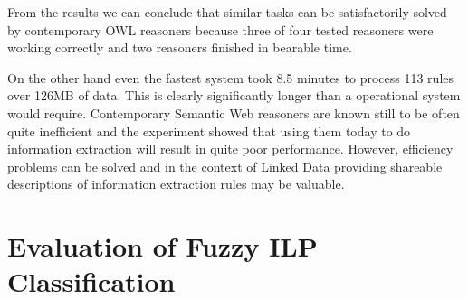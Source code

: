From the results we can conclude that similar tasks can be satisfactorily solved by contemporary OWL reasoners because three of four tested reasoners were working correctly and two reasoners finished in bearable time.

On the other hand even the fastest system took 8.5 minutes to process 113 rules over 126MB of data. This is clearly   significantly longer than a operational system would require. 
Contemporary Semantic Web reasoners are known still to be often quite inefficient and the experiment showed that using them today to do information extraction will result in quite poor performance. However, efficiency problems can be solved
and in the context of Linked Data providing shareable descriptions of information extraction rules may be valuable.















\section{Evaluation of Fuzzy ILP Classification} \label{sec:fuzzy_eval}
\graphicspath{{../img/ch80/}}

